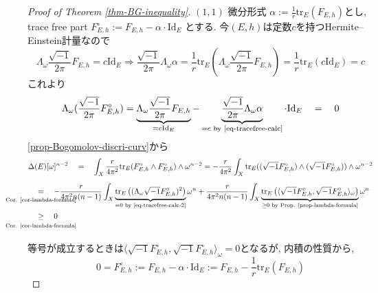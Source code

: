 \documentclass[dvipdfmx,a4paper,11pt]{article} %
\theoremstyle{definition}
\theoremstyle{remark}
\numberwithin{equation}{section}
\newcommand{\underalign}[2]{\quad \underset{\mathclap{\strut #1}}{#2}\quad}
\begin{document}
\begin{proof}[Proof of Theorem \ref{thm-BG-inequality}]
\((1,1)\) 微分形式
$\alpha := \frac{1}{r} \mathrm{tr}_{E}(F_{E,h})$とし, 
trace free part
\(
F_{E,h}^{\circ}
:= F_{E,h} -\alpha \cdot \mathrm{Id}_{E}
\)
とする. 
今$(E, h)$は定数$c$を持つHermite--Einstein計量なので
\begin{equation}
\label{eq-tracefree-calc}
\Lambda_{\omega}\frac{\sqrt{-1}}{2\pi} F_{E,h}
= c \mathrm{Id}_{E}
\Rightarrow
\frac{\sqrt{-1}}{2\pi}\Lambda_{\omega}\alpha=\frac{1}{r} 
\mathrm{tr}_{E}(\Lambda_{\omega} \frac{\sqrt{-1}}{2\pi} F_{E,h})
=\frac{1}{r}\mathrm{tr}_{E}(c \mathrm{Id}_{E})
=c
\end{equation}
これより
\begin{equation}
\label{eq-tracefree-calc-2}
\Lambda_{\omega}(\frac{\sqrt{-1}}{2\pi}F_{E,h}^{\circ}) 
=
\underbrace{\Lambda_{\omega}\frac{\sqrt{-1}}{2\pi} F_{E,h}}_{=c\mathrm{Id}_{E}}
-
\underbrace{\frac{\sqrt{-1}}{2\pi}
\Lambda_{\omega} \alpha}_{=c \text{ by \eqref{eq-tracefree-calc}}}
 \cdot \mathrm{Id}_{E}
\underalign{}{=}0
\end{equation}
\ref{prop-Bogomolov-discri-curv}から
\begin{align*}
&\Delta(E) [\omega]^{n-2}
\underalign{}{=} 
\int_{X} \frac{r}{4 \pi^2} 
\mathrm{tr}_{E} ({F_{E,h}^{\circ}}\wedge {F_{E,h}^{\circ}})  \wedge \omega^{n-2}
=
- \frac{r}{4 \pi^2} 
\int_{X} 
\mathrm{tr}_{E} ((\sqrt{-1}{F_{E,h}^{\circ}})\wedge(\sqrt{-1}{F_{E,h}^{\circ}}))  \wedge \omega^{n-2}
\\
&\underalign{\text{Cor. \ref{cor-lambda-formula}}}{=} 
-\frac{r}{4 \pi^2 n (n-1)} \int_{X} 
\underbrace{ \mathrm{tr}_E
\left( (\Lambda_{\omega}\sqrt{-1} {F_{E,h}^{\circ}})^2\right)}_{=0 \text{ by \eqref{eq-tracefree-calc-2}}}\omega^n
+\frac{r}{4 \pi^2 n (n-1)} 
\int_{X} 
\underbrace{\mathrm{tr}_E \left( \langle 
\sqrt{-1} F_{E,h}^{\circ}, \sqrt{-1}{F_{E,h}^{\circ}}\rangle_{\omega}\right)}_{\ge 0\text{ by Prop. \ref{prop-lambda-formula}}} 
\omega^n
\\
&\underalign{\text{Cor. \ref{cor-lambda-formula}}}{\ge} 0 
\end{align*}

等号が成立するときは$\langle \sqrt{-1} F_{E,h}^{\circ}, \sqrt{-1}{F_{E,h}^{\circ}}\rangle_{\omega}=0$となるが, 内積の性質から, 
$$
0=F_{E,h}^{\circ}
:= F_{E,h} -\alpha \cdot \mathrm{Id}_{E}
:=F_{E,h} - \frac{1}{r} \mathrm{tr}_{E}(F_{E,h})
$$
\end{proof}
\end{document}
